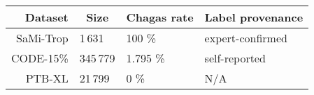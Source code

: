 \begin{tabular}{rlll}
\toprule
Dataset & \multicolumn{1}{c}{Size} & \multicolumn{1}{c}{Chagas rate} & Label provenance \\
\midrule
SaMi-Trop   & 1\,631     & 100 \%    & expert-confirmed \\
CODE-15\%   & 345\,779   & 1.795 \%  & self-reported \\
PTB-XL      & 21\,799    & 0 \%      & N/A \\
\bottomrule
\end{tabular}
